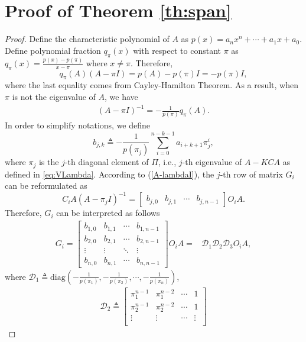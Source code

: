 \documentclass[12pt]{article}  %
\newtheorem*{proof}{\textbf{Proof}}
\begin{document}
\section{Proof of Theorem \ref{th:span}}\label{ap:span}
\begin{proof}
	Define the characteristic polynomial of $A$ as $p(x)=a_n x^n +\cdots+a_1 x +a_0$.
Define polynomial fraction  $q_\pi(x)$ with respect to constant $\pi$ as
$q_\pi(x)=\frac{p(x)-p(\pi)}{x-\pi}$ where $x\neq \pi$.
Therefore,
$$q_\pi(A)(A-\pi I) = p(A)-p(\pi)I=-p(\pi)I ,$$
where the last equality comes from Cayley-Hamilton Theorem.
As a result, when $\pi$ is not the eigenvalue of $A$, we have
\begin{align}\label{A-lambdaI}
(A-\pi I)^{-1}=-\frac{1}{p(\pi)} q_\pi(A).
\end{align}
In order to simplify notations, we define 
\begin{equation}\label{eq:bjk}
b_{j,k}\triangleq-\frac{1}{p(\pi_j)}\sum_{i=0}^{n-k-1} a_{i+k+1} \pi_j^i,
\end{equation}
where $\pi_j$ is the $j$-th diagonal element of $\Pi$, i.e., $j$-th eigenvalue of $A-KCA$ as defined in \eqref{eq:VLambda}.
According to (\ref{A-lambdaI}), the $j$-th row of matrix $G_i$ can be reformulated as
$$C_{i} A\left(A-\pi_{j} I\right)^{-1}=
\begin{bmatrix}
b_{j,0} & b_{j,1} & \cdots  & b_{j,n-1} 
\end{bmatrix} O_i A.$$
Therefore, $G_i$ can be interpreted as follows
\begin{align*}
G_i = \begin{bmatrix}
b_{1,0} & b_{1,1} & \cdots  & b_{1,n-1} \\
b_{2,0} & b_{2,1} & \cdots  & b_{2,n-1} \\
\vdots & \vdots & \ddots  & \vdots \\
b_{n,0} & b_{n,1} & \cdots  & b_{n,n-1} 
\end{bmatrix}
O_i A 
= & \mathcal{D}_1\mathcal{D}_2\mathcal{D}_3 O_i A , %
\end{align*}
where $\mathcal{D}_1\triangleq\text{diag}\left(-\frac{1}{p(\pi_1)},-\frac{1}{p(\pi_2)},\cdots,-\frac{1}{p(\pi_n)}\right)$,
\begin{align*}
\mathcal{D}_2\triangleq
\begin{bmatrix}
\pi_1^{n-1} & \pi_1^{n-2} & \cdots  & 1 \\
\pi_2^{n-1} & \pi_2^{n-2} & \cdots  & 1 \\
\vdots & \vdots & \cdots  & \vdots \\

\end{bmatrix}
\end{align*}
\end{proof}
\end{document}
